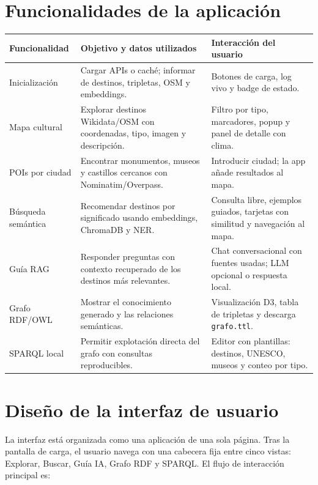 \documentclass[10pt,a4paper]{article}
\newcommand{\separaseccion}{\vspace{0.65\baselineskip}}
\begin{document}
\section{Funcionalidades de la aplicación}

\begin{table}[H]
\centering
\scriptsize
\begin{tabularx}{\textwidth}{p{2.6cm}X X}
\toprule
\textbf{Funcionalidad} & \textbf{Objetivo y datos utilizados} & \textbf{Interacción del usuario}\\
\midrule
Inicialización & Cargar APIs o caché; informar de destinos, tripletas, OSM y embeddings. & Botones de carga, log vivo y badge de estado.\\
Mapa cultural & Explorar destinos Wikidata/OSM con coordenadas, tipo, imagen y descripción. & Filtro por tipo, marcadores, popup y panel de detalle con clima.\\
POIs por ciudad & Encontrar monumentos, museos y castillos cercanos con Nominatim/Overpass. & Introducir ciudad; la app añade resultados al mapa.\\
Búsqueda semántica & Recomendar destinos por significado usando embeddings, ChromaDB y NER. & Consulta libre, ejemplos guiados, tarjetas con similitud y navegación al mapa.\\
Guía RAG & Responder preguntas con contexto recuperado de los destinos más relevantes. & Chat conversacional con fuentes usadas; LLM opcional o respuesta local.\\
Grafo RDF/OWL & Mostrar el conocimiento generado y las relaciones semánticas. & Visualización D3, tabla de tripletas y descarga \texttt{grafo.ttl}.\\
SPARQL local & Permitir explotación directa del grafo con consultas reproducibles. & Editor con plantillas: destinos, UNESCO, museos y conteo por tipo.\\
\bottomrule
\end{tabularx}
\end{table}

\separaseccion{}
\section{Diseño de la interfaz de usuario}

La interfaz está organizada como una aplicación de una sola página. Tras la pantalla de carga, el usuario navega con una cabecera fija entre cinco vistas: Explorar, Buscar, Guía IA, Grafo RDF y SPARQL. El flujo de interacción principal es:
\end{document}
